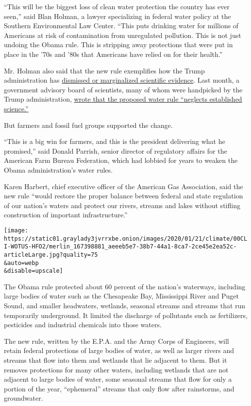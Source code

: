 ``This will be the biggest loss of clean water protection the country
has ever seen,'' said Blan Holman, a lawyer specializing in federal
water policy at the Southern Environmental Law Center. ``This puts
drinking water for millions of Americans at risk of contamination from
unregulated pollution. This is not just undoing the Obama rule. This is
stripping away protections that were put in place in the '70s and '80s
that Americans have relied on for their health.''

Mr. Holman also said that the new rule exemplifies how the Trump
administration has
\href{https://www.nytimes3xbfgragh.onion/2019/12/28/climate/trump-administration-war-on-science.html}{dismissed
or marginalized scientific evidence}. Last month, a government advisory
board of scientists, many of whom were handpicked by the Trump
administration,
\href{https://www.nytimes3xbfgragh.onion/2019/12/31/climate/epa-science-panel-trump.html}{wrote
that the proposed water rule ``neglects established science.''}

But farmers and fossil fuel groups supported the change.

``This is a big win for farmers, and this is the president delivering
what he promised,'' said Donald Parrish, senior director of regulatory
affairs for the American Farm Bureau Federation, which had lobbied for
years to weaken the Obama administration's water rules.

Karen Harbert, chief executive officer of the American Gas Association,
said the new rule ``would restore the proper balance between federal and
state regulation of our nation's waters and protect our rivers, streams
and lakes without stifling construction of important infrastructure.''

\texttt{[image: https://static01.graylady3jvrrxbe.onion/images/2020/01/21/climate/00CLI-WOTUS-HFO2/merlin\_167398881\_aeeeb5e7-38b7-44a1-8ca7-2ce45e2ea52c-articleLarge.jpg?quality=75\\\&auto=webp\\\&disable=upscale]}

The Obama rule protected about 60 percent of the nation's waterways,
including large bodies of water such as the Chesapeake Bay, Mississippi
River and Puget Sound, and smaller headwaters, wetlands, seasonal
streams and streams that run temporarily underground. It limited the
discharge of pollutants such as fertilizers, pesticides and industrial
chemicals into those waters.

The new rule, written by the E.P.A. and the Army Corps of Engineers,
will retain federal protections of large bodies of water, as well as
larger rivers and streams that flow into them and wetlands that lie
adjacent to them. But it removes protections for many other waters,
including wetlands that are not adjacent to large bodies of water, some
seasonal streams that flow for only a portion of the year, ``ephemeral''
streams that only flow after rainstorms, and groundwater.

